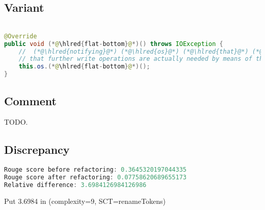 \documentclass[11pt]{article}
\DeclareRobustCommand{\hlred}[1]{{\sethlcolor{YellowOrange}\hl{#1}}}
\begin{document}
  \subsection{Variant}

  \begin{lstlisting}[language=java]

@Override
public void (*@\hlred{flat-bottom}@*)() throws IOException {
    //  (*@\hlred{notifying}@*) (*@\hlred{os}@*) (*@\hlred{that}@*) (*@\hlred{this}@*) (*@\hlred{object}@*) (*@\hlred{will}@*) (*@\hlred{flush}@*) (*@\hlred{out}@*) (*@\hlred{data}@*) (*@\hlred{without}@*) (*@\hlred{notice}@*) (*@\hlred{and}@*) (*@\hlred{informing}@*) (*@\hlred{that}@*) (*@\hlred{we}@*) (*@\hlred{can}@*) (*@\hlred{detect}@*) (*@\hlred{when}@*)
    // that further write operations are actually needed by means of the isOverflown() method.
    this.os.(*@\hlred{flat-bottom}@*)();
}
  \end{lstlisting}

  \subsection{Comment}

  TODO.

  \subsection{Discrepancy}

  \begin{lstlisting}[language=java]
Rouge score before refactoring: 0.3645320197044335
Rouge score after refactoring: 0.07758620689655173
Relative difference: 3.6984126984126986
  \end{lstlisting}

  Put 3.6984 in (complexity=9, SCT=renameTokens)
\end{document}
